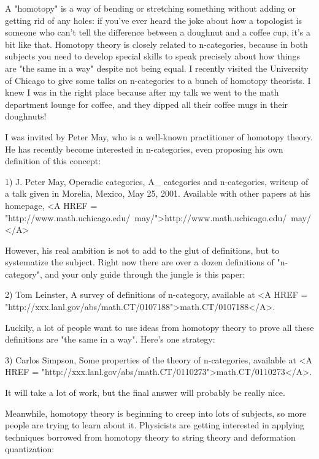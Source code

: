 




A "homotopy" is a way of bending or stretching something
without adding or getting rid of any holes: if you've ever heard the
joke about how a topologist is someone who can't tell the difference
between a doughnut and a coffee cup, it's a bit like that.  Homotopy
theory is closely related to n-categories, because in both subjects you
need to develop special skills to speak precisely about how things are
"the same in a way" despite not being equal.  I recently visited
the University of Chicago to give some talks on n-categories to a bunch
of homotopy theorists.  I knew I was in the right place because after my
talk we went to the math department lounge for coffee, and they dipped
all their coffee mugs in their doughnuts!

I was invited by Peter May, who is a well-known practitioner of 
homotopy theory.  He has recently become interested in n-categories, 
even proposing his own definition of this concept:

1) J. Peter May, Operadic categories, A_{\infty } categories and
n-categories, writeup of a talk given in Morelia, Mexico, 
May 25, 2001.  Available with other papers at his homepage,
<A HREF = "http://www.math.uchicago.edu/~may/">http://www.math.uchicago.edu/~may/</A>

However, his real ambition is not to add to the glut of definitions,
but to systematize the subject.  Right now there are over a dozen
definitions of "n-category", and your only guide through the jungle 
is this paper:

2) Tom Leinster, A survey of definitions of n-category,
available at <A HREF = "http://xxx.lanl.gov/abs/math.CT/0107188">math.CT/0107188</A>.

Luckily, a lot of people want to use ideas from homotopy theory to prove
all these definitions are "the same in a way".  Here's one strategy:

3) Carlos Simpson, Some properties of the theory of n-categories,
available at 
<A HREF = "http://xxx.lanl.gov/abs/math.CT/0110273">math.CT/0110273</A>.

It will take a lot of work, but the final answer will probably be
really nice.

Meanwhile, homotopy theory is beginning to creep into lots of subjects,
so more people are trying to learn about it.  Physicists are getting
interested in applying techniques borrowed from homotopy theory to
string theory and deformation quantization:

